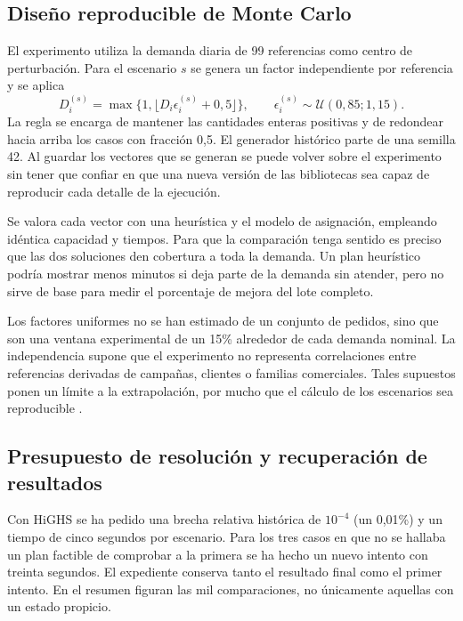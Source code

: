 \subsection{Diseño reproducible de Monte Carlo}
El experimento utiliza la demanda diaria de 99 referencias como centro de perturbación. Para el escenario $s$ se genera un factor independiente por referencia y se aplica
\begin{equation}
D_i^{(s)}=\max\{1,\lfloor D_i\epsilon_i^{(s)}+0,5\rfloor\},\qquad
\epsilon_i^{(s)}\sim\mathcal U(0,85;1,15).
\end{equation}
La regla se encarga de mantener las cantidades enteras positivas y de redondear hacia arriba los casos con fracción 0,5. El generador histórico parte de una semilla 42. Al guardar los vectores que se generan se puede volver sobre el experimento sin tener que confiar en que una nueva versión de las bibliotecas sea capaz de reproducir cada detalle de la ejecución.

Se valora cada vector con una heurística y el modelo de asignación, empleando idéntica capacidad y tiempos. Para que la comparación tenga sentido es preciso que las dos soluciones den cobertura a toda la demanda. Un plan heurístico podría mostrar menos minutos si deja parte de la demanda sin atender, pero no sirve de base para medir el porcentaje de mejora del lote completo.

Los factores uniformes no se han estimado de un conjunto de pedidos, sino que son una ventana experimental de un 15\% alrededor de cada demanda nominal. La independencia supone que el experimento no representa correlaciones entre referencias derivadas de campañas, clientes o familias comerciales. Tales supuestos ponen un límite a la extrapolación, por mucho que el cálculo de los escenarios sea reproducible \cite{law}.

\subsection{Presupuesto de resolución y recuperación de resultados}
Con HiGHS se ha pedido una brecha relativa histórica de $10^{-4}$ (un 0,01\%) y un tiempo de cinco segundos por escenario. Para los tres casos en que no se hallaba un plan factible de comprobar a la primera se ha hecho un nuevo intento con treinta segundos. El expediente conserva tanto el resultado final como el primer intento. En el resumen figuran las mil comparaciones, no únicamente aquellas con un estado propicio.

